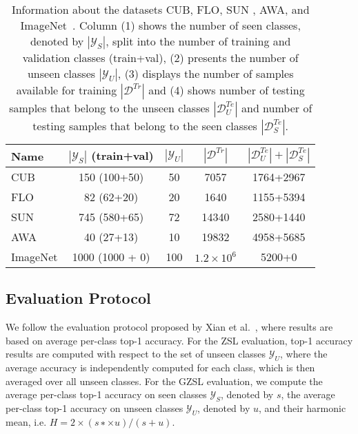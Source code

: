 \documentclass[runningheads]{llncs}
\begin{document}
\begin{table}[t]
\centering
\label{table:dataset-stats}
\caption{Information about the datasets CUB\cite{welinder2010caltech}, FLO\cite{nilsback2008automated}, SUN \cite{xiao2010sun}, AWA\cite{XianCVPR2017}, and ImageNet~\cite{deng2009imagenet}. Column (1) shows the number of seen classes, denoted by $|\mathcal{Y}_S|$, split into the number of training and validation classes (train+val), (2) presents the number of unseen classes $| \mathcal{Y}_U |$, (3) displays the number of samples available for training $|\mathcal{D}^{Tr}|$ and (4) shows number of testing samples that belong to the unseen classes $|\mathcal{D}_U^{Te}|$ and number of testing samples that belong to the seen classes $|\mathcal{D}_S^{Te}|$.}
\begin{tabular}{l|c|c|c|c}
\hline
\textbf{Name} & $|\mathcal{Y}_S|$ (train+val) & $|\mathcal{Y}_U|$ & $|\mathcal{D}^{Tr}|$ & $|\mathcal{D}^{Te}_U|+|\mathcal{D}^{Te}_S|$ \\
\hline
CUB     & 150 (100+50) & 50 & 7057 & 1764+2967  \\
FLO     & 82 (62+20) & 20 & 1640 & 1155+5394  \\
SUN    & 745 (580+65) & 72 & 14340 & 2580+1440   \\
AWA    & 40 (27+13) & 10 & 19832 & 4958+5685   \\
ImageNet & 1000 (1000 + 0) & 100 & $1.2 \times 10^6$ & 5200+0    \\
\hline
\end{tabular}
\end{table}



\subsection{Evaluation Protocol}

We follow the evaluation protocol proposed by Xian et al.~\cite{XianCVPR2017}, where results are based on average per-class top-1 accuracy.  For the ZSL evaluation, top-1 accuracy results are computed with respect to the set of unseen classes $\mathcal{Y}_U$, where the average accuracy is  independently computed for each class, which is then averaged over all unseen classes.  For the GZSL evaluation, we compute the average per-class top-1 accuracy on seen classes $\mathcal{Y}_S$, denoted by $s$, the average per-class top-1 accuracy on unseen classes $\mathcal{Y}_U$, denoted by $u$, and their harmonic mean, i.e. $H = 2 \times (s ∗\times u)/(s + u)$.
\end{document}
